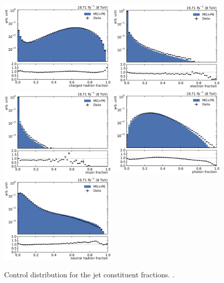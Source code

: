 \begin{figure}[htbp]
    \centering
    \includegraphics[width=0.49\textwidth]{figures/measurement/jet_constituent_chargedHadronFraction.pdf}\hfill
    \includegraphics[width=0.49\textwidth]{figures/measurement/jet_constituent_electronFraction.pdf}
    \includegraphics[width=0.49\textwidth]{figures/measurement/jet_constituent_muonFraction.pdf}\hfill
    \includegraphics[width=0.49\textwidth]{figures/measurement/jet_constituent_neutralEMFraction.pdf}
    \includegraphics[width=0.49\textwidth]{figures/measurement/jet_constituent_neutralHadronFraction.pdf}
    \caption{Control distribution for the jet constituent fractions. .}
    \label{fig:jet_constituents_fractions}
\end{figure}

